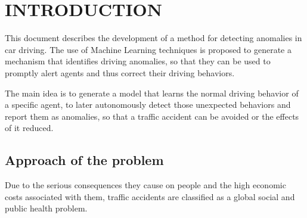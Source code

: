 
\chapter{\uppercase{Introduction}}
\label{Capitulo 1}

This document describes the development of a method for detecting anomalies in car driving. The use of Machine Learning techniques is proposed to generate a mechanism that identifies driving anomalies, so that they can be used to promptly alert agents and thus correct their driving behaviors.


\vspace{5mm} %

The main idea is to generate a model that learns the normal driving behavior of a specific agent, to later autonomously detect those unexpected behaviors and report them as anomalies, so that a traffic accident can be avoided or the effects of it reduced.

\section{Approach of the problem}

Due to the serious consequences they cause on people and the high economic costs associated with them, traffic accidents are classified as a global social and public health problem.

\vspace{5mm} %

